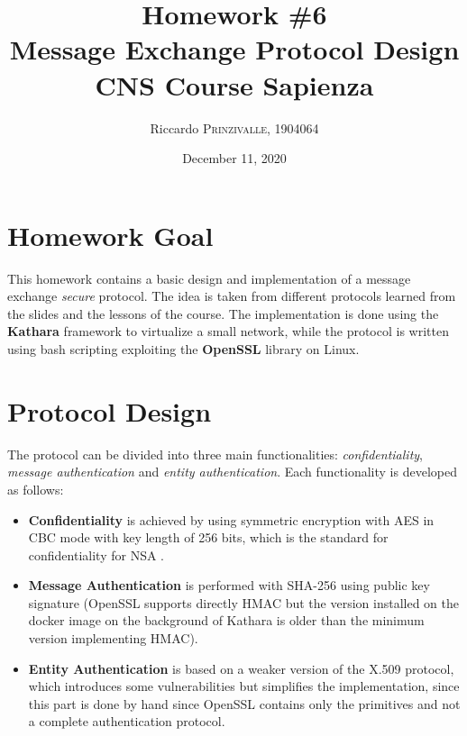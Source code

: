 \documentclass{article}
\title{Homework \#6 \\Message Exchange Protocol Design \\[0.2em]\small{}CNS Course Sapienza} %
\author{Riccardo \textsc{Prinzivalle}, 1904064} %
\date{December 11, 2020} %
\begin{document}
\maketitle %


\section{Homework Goal}

This homework contains a basic design and implementation of a message exchange \textit{secure} protocol. The idea is taken from different protocols learned from the slides and the lessons of the course. The implementation is done using the \textbf{Kathara} framework to virtualize a small network, while the protocol is written using bash scripting exploiting the \textbf{OpenSSL} library on Linux.


\section{Protocol Design}

The protocol can be divided into three main functionalities: \textit{confidentiality}, \textit{message authentication} and \textit{entity authentication}. Each functionality is developed as follows:

\begin{itemize}
	\item \textbf{Confidentiality} is achieved by using symmetric encryption with AES in CBC mode with key length of 256 bits, which is the standard for confidentiality for NSA \cite{AES_NSA}.
	\item \textbf{Message Authentication} is performed with SHA-256 using public key signature (OpenSSL supports directly HMAC but the version installed on the docker image on the background of Kathara is older than the minimum version implementing HMAC).
	\item \textbf{Entity Authentication} is based on a weaker version of the X.509 protocol, which introduces some vulnerabilities but simplifies the implementation, since this part is done by hand since OpenSSL contains only the primitives and not a complete authentication protocol. 
\end{itemize}
\end{document}
